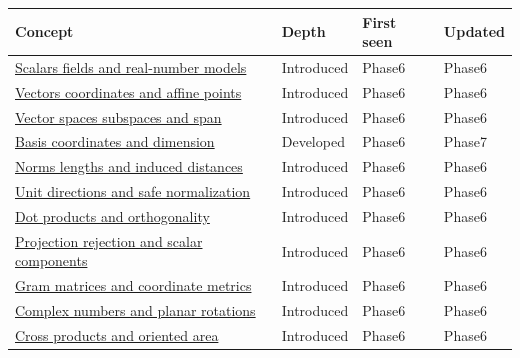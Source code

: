 {\def\LTcaptype{none} %
\begin{longtable}[]{@{}
  >{\raggedright\arraybackslash}p{}
  >{\raggedright\arraybackslash}p{}
  >{\raggedright\arraybackslash}p{}
  >{\raggedright\arraybackslash}p{}@{}}
\toprule\noalign{}
\begin{minipage}[b]{\linewidth}\raggedright
Concept
\end{minipage} & \begin{minipage}[b]{\linewidth}\raggedright
Depth
\end{minipage} & \begin{minipage}[b]{\linewidth}\raggedright
First seen
\end{minipage} & \begin{minipage}[b]{\linewidth}\raggedright
Updated
\end{minipage} \\
\midrule\noalign{}
\endhead
\bottomrule\noalign{}
\endlastfoot
\hyperref[appendix-52051ad550fe]{Scalars fields and real-number models} & Introduced & Phase6 & Phase6 \\
\hyperref[appendix-0659864c0aa3]{Vectors coordinates and affine points} & Introduced & Phase6 & Phase6 \\
\hyperref[appendix-173b52c063ae]{Vector spaces subspaces and span} & Introduced & Phase6 & Phase6 \\
\hyperref[appendix-ce0341f7ea0d]{Basis coordinates and dimension} & Developed & Phase6 & Phase7 \\
\hyperref[appendix-49933872bb51]{Norms lengths and induced distances} & Introduced & Phase6 & Phase6 \\
\hyperref[appendix-f744e41b95b4]{Unit directions and safe normalization} & Introduced & Phase6 & Phase6 \\
\hyperref[appendix-8bc4e8fc547c]{Dot products and orthogonality} & Introduced & Phase6 & Phase6 \\
\hyperref[appendix-505a502c372a]{Projection rejection and scalar components} & Introduced & Phase6 & Phase6 \\
\hyperref[appendix-3b863809f82a]{Gram matrices and coordinate metrics} & Introduced & Phase6 & Phase6 \\
\hyperref[appendix-f77eadcc4a93]{Complex numbers and planar rotations} & Introduced & Phase6 & Phase6 \\
\hyperref[appendix-2391db8052b1]{Cross products and oriented area} & Introduced & Phase6 & Phase6 \\

\end{longtable}}

